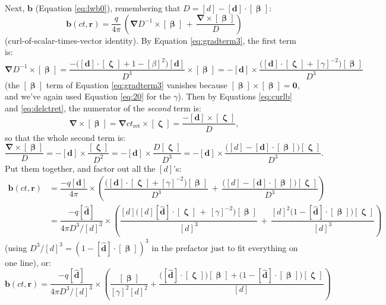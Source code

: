 \documentclass[12pt]{article}
\renewcommand{\vv}[1]{\mathbf{#1}}
\newcommand{\vvbeta}{\bm{\upbeta}}
\newcommand{\vvzeta}{\bm{\upzeta}}
\newcommand{\del}{\boldsymbol{\nabla}}
\begin{document}
Next, $\vv b$ (Equation \ref{eq:lwb0}), remembering that $D = [d] - [\vv d] \cdot [\vvbeta]$:
\begin{equation*}
\vv b (ct, \vv r) = \dfrac{q}{4 \pi} \, \left(\del D^{-1} \times [\vvbeta] \, + \, \dfrac{\del \times [\vvbeta]}{D} \right)
\end{equation*}
(curl-of-scalar-times-vector identity). By Equation \ref{eq:gradterm3}, the first term is:
\begin{equation*}
\del D^{-1} \times [\vvbeta] =  \dfrac{- \big( [\vv d] \cdot [\vvzeta] + 1 - [\beta]^2 \big) [\vv d] }{D^{3}} \times [\vvbeta] = - [\vv d] \times \dfrac{\big( [\vv d] \cdot [\vvzeta] + [\gamma]^{-2} \big) [\vvbeta] }{D^{3}}
\end{equation*}
(the $[\vvbeta]$ term of Equation \ref{eq:gradterm3} vanishes because $[\vvbeta] \times [\vvbeta] = \vv 0$, and we've again used Equation \ref{eq:20} for the $\gamma$). Then by Equations \ref{eq:curlb} and \ref{eq:delctret}, the numerator of the \emph{second} term is:
\begin{equation*}
\del \times [\vvbeta] = \del ct_{\mathrm{ret}} \times [\vvzeta] = \dfrac{-[\vv d] \times [\vvzeta] }{D},
\end{equation*}
so that the whole second term is:
\begin{equation*}
\dfrac{\del \times [\vvbeta]}{D} = -[\vv d] \times \dfrac{[\vvzeta]}{D^2} = -[\vv d] \times  \dfrac{D [\vvzeta] }{D^3} = - [\vv d] \times \dfrac{ \big( [d] - [\vv d] \cdot [\vvbeta] \big) [\vvzeta] }{D^3}.
\end{equation*}
Put them together, and factor out all the $[d]$'s:
\begin{equation*}
\begin{split}
\vv b (ct, \vv r) &= \dfrac{- q [\vv d]}{4 \pi} \times \left(\dfrac{\big( [\vv d] \cdot [\vvzeta] + [\gamma]^{-2} \big) [\vvbeta] }{D^{3}} \, + \, \dfrac{\big( [d] - [\vv d] \cdot [\vvbeta] \big) [\vvzeta] }{D^3} \right) \\[4pt]
&= \dfrac{- q [\vv{\hat{d}}]}{4 \pi D^{3} / [d]^3} \times \left(\dfrac{[d] \big( [d] [\vv{\hat{d}}] \cdot [\vvzeta] \, + \, [\gamma]^{-2} \big) [\vvbeta] }{[d]^3} \, + \, \dfrac{[d]^2 \big( 1 - [\vv{\hat{d}}] \cdot [\vvbeta] \big) [\vvzeta] }{[d]^3} \right)
\end{split}
\end{equation*}
(using $D^3 / [d]^3  = (1 - [\vv{\hat{d}}] \cdot [\vvbeta])^3$ in the prefactor just to fit everything on one line), or:
\begin{equation}\label{eq:retbpart0}
\vv b (ct, \vv r) = \dfrac{- q [\vv{\hat{d}}]}{4 \pi D^{3} / [d]^3} \times \left(\dfrac{[\vvbeta] }{[\gamma]^{2} [d]^2} + \dfrac{\big( [\vv{\hat{d}}] \cdot [\vvzeta] \big)[\vvbeta] + \big( 1 - [\vv{\hat{d}}] \cdot [\vvbeta] \big) [\vvzeta] }{[d]} \right)
\end{equation}
\end{document}
